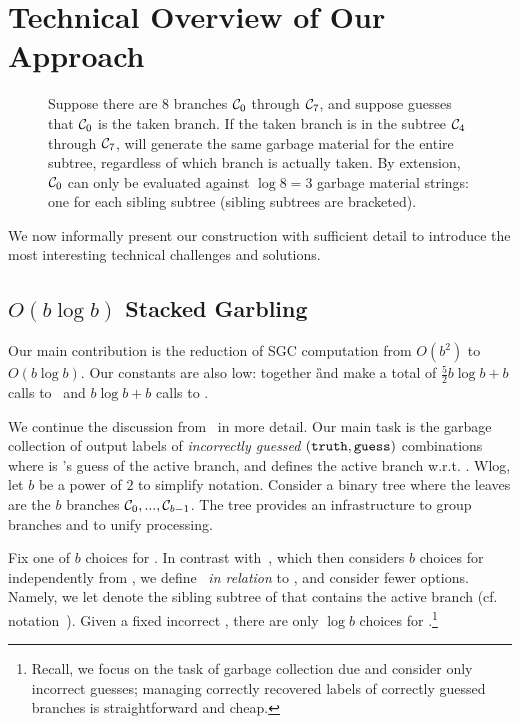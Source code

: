
\section{Technical Overview of Our Approach}
\label{sec:techOverview}

\begin{figure*}[t]
  \centering
  
  \caption{%
    Suppose there are $8$ branches $\mathcal C_0$ through $\mathcal C_7$, and
    suppose \E guesses that $\mathcal C_0$ is the taken branch.
    If the taken branch is in the subtree $\mathcal C_4$ through $\mathcal C_7$,
    \E will generate the same garbage material for the entire subtree,
    regardless of which branch is actually taken.
    By extension, $\mathcal C_0$ can only be evaluated against $\log 8 = 3$ garbage
    material strings: one for each sibling subtree (sibling subtrees
    are bracketed).
  }\label{fig:seed-tree}
\end{figure*}

We now informally present our construction with sufficient detail to introduce
the most interesting technical challenges and solutions.

\subsection{$O(b\log b)$ Stacked Garbling}
\label{sec:techOverviewSG}

Our main contribution is the reduction of SGC computation
from $O(b^2)$ to $O(b \log b)$.  Our constants are also
low: together \G and \E make a total of $\frac{5}{2} b \log b + b$ calls to \Gb\
and $b\log b + b$ calls  to \Ev.

We continue the discussion from~ in more detail.
Our main task is the garbage collection of output labels of {\em
incorrectly guessed} $(\mathtt{truth}, \mathtt{guess})$ combinations 
where
\guess is \E's guess of the active branch, and \truth defines the active branch w.r.t. \guess.
Wlog, let $b$ be a power of $2$ to simplify notation.
Consider a binary tree where the leaves are the $b$ branches
$\mathcal C_0,...,\mathcal C_{b-1}$.  The tree provides an infrastructure to group branches and to unify processing.


Fix one of $b$ choices for \guess.  In contrast with~\HK, which then considers $b$ choices for \truth independently from \guess, we define \truth\ {\em in relation} to \guess, and consider fewer \truth options.  Namely,
we  let \truth  denote the sibling subtree of \guess that contains the
active branch (cf. notation~\Cref{sec:intuition}). 
Given a fixed incorrect \guess, there are only $\log b$ choices for
\truth.\footnote{Recall, we focus on the task of garbage collection due and consider only  incorrect guesses;  managing correctly recovered labels of correctly guessed branches is straightforward and cheap.}

